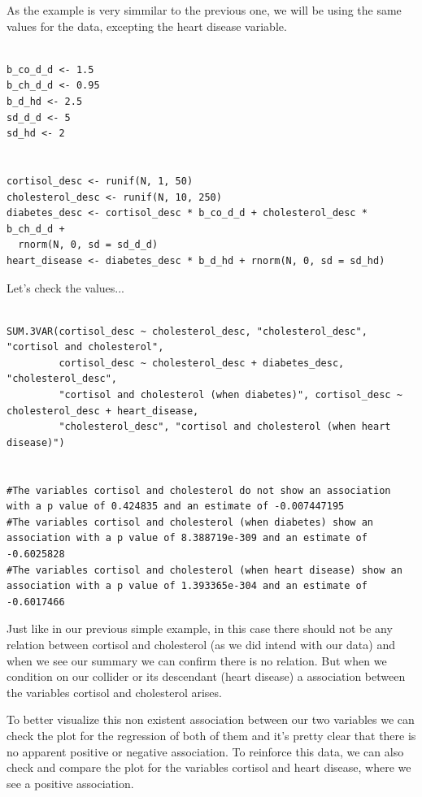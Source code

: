 \documentclass{article}
\begin{document}
As the example is very simmilar to the previous one, we will be using the same values for the data, excepting the heart disease variable.
 
 
\begin{lstlisting}
 
b_co_d_d <- 1.5
b_ch_d_d <- 0.95
b_d_hd <- 2.5
sd_d_d <- 5
sd_hd <- 2


cortisol_desc <- runif(N, 1, 50)
cholesterol_desc <- runif(N, 10, 250)
diabetes_desc <- cortisol_desc * b_co_d_d + cholesterol_desc * b_ch_d_d + 
  rnorm(N, 0, sd = sd_d_d)
heart_disease <- diabetes_desc * b_d_hd + rnorm(N, 0, sd = sd_hd)

\end{lstlisting}

Let's check the values...

\begin{lstlisting}

SUM.3VAR(cortisol_desc ~ cholesterol_desc, "cholesterol_desc", "cortisol and cholesterol", 
         cortisol_desc ~ cholesterol_desc + diabetes_desc, "cholesterol_desc",
         "cortisol and cholesterol (when diabetes)", cortisol_desc ~ cholesterol_desc + heart_disease,
         "cholesterol_desc", "cortisol and cholesterol (when heart disease)")


#The variables cortisol and cholesterol do not show an association with a p value of 0.424835 and an estimate of -0.007447195 
#The variables cortisol and cholesterol (when diabetes) show an association with a p value of 8.388719e-309 and an estimate of -0.6025828 
#The variables cortisol and cholesterol (when heart disease) show an association with a p value of 1.393365e-304 and an estimate of -0.6017466 

\end{lstlisting}

Just like in our previous simple example, in this case there should not be any relation between cortisol and cholesterol (as we did intend with our data) and when we see our summary we can confirm there is no relation. But when we  condition on our collider or its descendant (heart disease) a association between the variables cortisol and cholesterol arises. 

To better visualize this non existent association between our two variables we can check the plot for the regression of both of them and it's pretty clear that there is no apparent positive or negative association. To reinforce this data, we can also check and compare the plot for the variables cortisol and heart disease, where we see a positive association.
\end{document}
